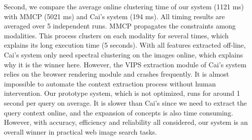 Second, we compare the average online clustering time of our system (1121 ms)
with MMCP (5021 ms) and Cai's system (194 ms).
All timing results are averaged over 5 independent runs.
MMCP propagates the constraints among modalities.
This process clusters
on each modality for several times, which explains its long execution time (5 seconds).
With all features extracted off-line, Cai's system
only need spectral clustering on the images online,
which explains why it is the winner here.
However, the VIPS extraction module of Cai's system relies on
the browser rendering module and crashes frequently. %
It is almost impossible to automate the context
extraction process without human intervention.
Our prototype system, which is not optimized,
runs for around 1 second per query on average.
It is slower than Cai's %
since we need to extract the query context online,
and the expansion of concepts is also time consuming.
However, with accuracy, efficiency and reliability all considered,
our system is an overall winner in practical web image search tasks.
%

